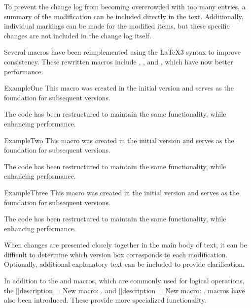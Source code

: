 \documentclass[a4paper, 11pt]{article}
\begin{document}
To prevent the change log from becoming overcrowded with too many entries, a summary of the modification can be included directly in the text. Additionally, individual markings can be made for the modified items, but these specific changes are not included in the change log itself.

\begin{DocsExample}
    Several macros have been reimplemented using the \LaTeX 3 syntax to improve consistency. These rewritten macros include , , and , which have now better performance.

    \begin{Macro*}{ExampleOne}{}{}
        This macro was created in the initial version and serves as the foundation for subsequent versions.

        The code has been restructured to maintain the same functionality, while enhancing performance.
    \end{Macro*}

    \begin{Macro*}{ExampleTwo}{}{}
        This macro was created in the initial version and serves as the foundation for subsequent versions.

        The code has been restructured to maintain the same functionality, while enhancing performance.
    \end{Macro*}

    \begin{Macro*}{ExampleThree}{}{}
        This macro was created in the initial version and serves as the foundation for subsequent versions.

        The code has been restructured to maintain the same functionality, while enhancing performance.
    \end{Macro*}
\end{DocsExample}

When changes are presented closely together in the main body of text, it can be difficult to determine which version box corresponds to each modification. Optionally, additional explanatory text can be included to provide clarification.

\begin{DocsExample}
    In addition to the  and  macros, which are commonly used for logical operations, the []{description = New macro: .} and []{description = New macro: .} macros have also been introduced. These provide more specialized functionality.
\end{DocsExample}
\end{document}
